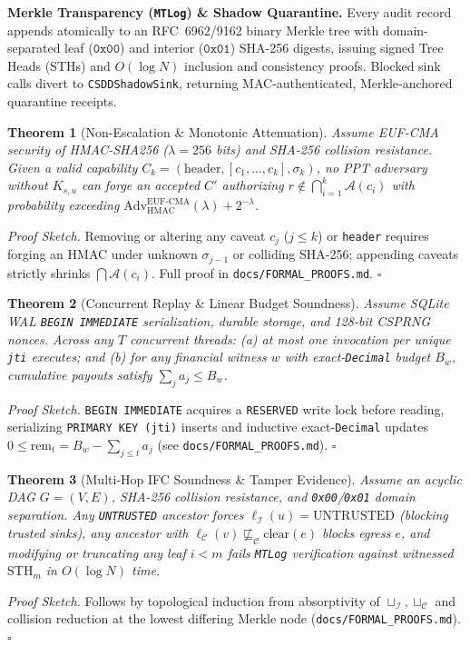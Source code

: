 \documentclass[10pt,twocolumn,letterpaper]{article}
\newtheorem{theorem}{Theorem}
\begin{document}
\textbf{Merkle Transparency (\texttt{MTLog}) \& Shadow Quarantine.} Every audit record appends atomically to an RFC~6962/9162 binary Merkle tree with domain-separated leaf ($\texttt{0x00}$) and interior ($\texttt{0x01}$) SHA-256 digests, issuing signed Tree Heads (STHs) and $O(\log N)$ inclusion and consistency proofs. Blocked sink calls divert to \texttt{CSDDShadowSink}, returning MAC-authenticated, Merkle-anchored quarantine receipts.

\begin{theorem}[Non-Escalation \& Monotonic Attenuation]
Assume EUF-CMA security of HMAC-SHA256 ($\lambda=256$ bits) and SHA-256 collision resistance. Given a valid capability $C_k = (\text{header}, [c_1,\dots,c_k], \sigma_k)$, no PPT adversary without $K_{s,u}$ can forge an accepted $C'$ authorizing $r \notin \bigcap_{i=1}^k \mathcal{A}(c_i)$ with probability exceeding $\text{Adv}^{\text{EUF-CMA}}_{\text{HMAC}}(\lambda) + 2^{-\lambda}$.
\end{theorem}
\noindent\textit{Proof Sketch.} Removing or altering any caveat $c_j$ ($j\le k$) or \texttt{header} requires forging an HMAC under unknown $\sigma_{j-1}$ or colliding SHA-256; appending caveats strictly shrinks $\bigcap \mathcal{A}(c_i)$. Full proof in \texttt{docs/FORMAL\_PROOFS.md}. \hfill$\square$

\begin{theorem}[Concurrent Replay \& Linear Budget Soundness]
Assume SQLite WAL \texttt{BEGIN IMMEDIATE} serialization, durable storage, and 128-bit CSPRNG nonces. Across any $T$ concurrent threads: (a) at most one invocation per unique \texttt{jti} executes; and (b) for any financial witness $w$ with exact-\texttt{Decimal} budget $B_w$, cumulative payouts satisfy $\sum_j a_j \le B_w$.
\end{theorem}
\noindent\textit{Proof Sketch.} \texttt{BEGIN IMMEDIATE} acquires a \texttt{RESERVED} write lock before reading, serializing \texttt{PRIMARY KEY (jti)} inserts and inductive exact-\texttt{Decimal} updates $0 \le \text{rem}_t = B_w - \sum_{j \le t} a_j$ (see \texttt{docs/FORMAL\_PROOFS.md}). \hfill$\square$

\begin{theorem}[Multi-Hop IFC Soundness \& Tamper Evidence]
Assume an acyclic DAG $G=(V,E)$, SHA-256 collision resistance, and \texttt{0x00}/\texttt{0x01} domain separation. Any \texttt{UNTRUSTED} ancestor forces $\ell_{\mathcal{I}}(u)=\text{UNTRUSTED}$ (blocking trusted sinks), any ancestor with $\ell_{\mathcal{C}}(v) \not\sqsubseteq_{\mathcal{C}} \text{clear}(e)$ blocks egress $e$, and modifying or truncating any leaf $i < m$ fails \texttt{MTLog} verification against witnessed $\text{STH}_m$ in $O(\log N)$ time.
\end{theorem}
\noindent\textit{Proof Sketch.} Follows by topological induction from absorptivity of $\sqcup_{\mathcal{I}},\sqcup_{\mathcal{C}}$ and collision reduction at the lowest differing Merkle node (\texttt{docs/FORMAL\_PROOFS.md}). \hfill$\square$
\end{document}
